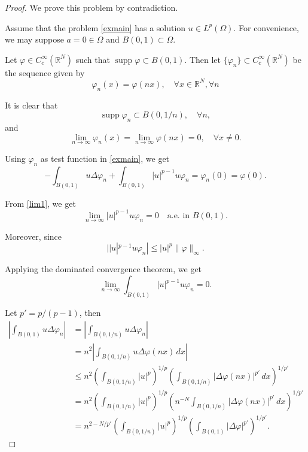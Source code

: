 \documentclass[a4paper, 11pt]{report}
\theoremstyle{definition}\newtheorem*{rmk}{Remark}
\DeclareMathOperator{\supp}{supp}
\begin{document}
\begin{proof}
We prove this problem by contradiction.

Assume that the problem \eqref{exmain} has a solution $u\in L^p(\Omega)$. For convenience, we may suppose $a = 0 \in \Omega$ and $B(0,1) \subset \Omega$.

Let $\varphi \in C_c^{\infty}(\mathbb{R}^N)$ such that $\supp \varphi \subset B(0,1)$. Then let $\{\varphi_n\}\subset C_c^{\infty}(\mathbb{R}^N)$ be the sequence given by
\[
\varphi_n(x) = \varphi(nx), \quad \forall x\in \mathbb{R}^N, \forall n
\]

It is clear that 
\[
\supp \varphi_n \subset B(0, 1/n), \quad \forall n,
\]
and
\begin{equation}\label{lim1}
\lim_{n\to \infty} \varphi_n(x) =\lim_{n\to \infty}\varphi(nx) = 0 ,\quad \forall x \neq 0.
\end{equation}

Using $\varphi_n$ as test function in \eqref{exmain}, we get
\begin{equation}\label{dira1}
-\int_{B(0,1)} u \Delta \varphi_n + \int_{B(0,1)} |u|^{p-1}u\varphi_n = \varphi_n(0) = \varphi (0).
\end{equation}

From \eqref{lim1}, we get
\[
\lim_{n\to \infty} |u|^{p-1}u\varphi_n = 0 \quad\text{a.e.\ in } B(0,1).
\]

Moreover, since
\[
||u|^{p-1}u\varphi_n| \le |u|^p \| \varphi\|_{\infty}.
\]

Applying the dominated convergence theorem, we get
\begin{equation}\label{dira2}
\lim_{n\to \infty} \int_{B(0,1)}|u|^{p-1}u\varphi_n = 0.
\end{equation}

Let $p' = p/(p-1)$, then
\begin{align*}
\left|\int_{B(0,1)} u\Delta \varphi_n\right| &= \left|\int_{B(0,1/n)}u\Delta \varphi_n\right|\\
&= n^2 \left|\int_{B(0,1/n)} u \Delta \varphi (nx)\, dx\right|\\
&\le n^2 \left(\int_{B(0,1/n)} |u|^p\right)^{1/p}\left(\int_{B(0,1/n)} |\Delta\varphi (nx)|^{p'}\,dx\right)^{1/p'}\\
&= n^2 \left(\int_{B(0,1/n)} |u|^p\right)^{1/p}\left(n^{-N}\int_{B(0,1/n)} |\Delta\varphi (nx)|^{p'}\,dx\right)^{1/p'}\\
&= n^{2-N/p'} \left(\int_{B(0,1/n)} |u|^p\right)^{1/p}\left(\int_{B(0,1)} |\Delta\varphi|^{p'}\right)^{1/p'}.
\end{align*}


\end{proof}
\end{document}
